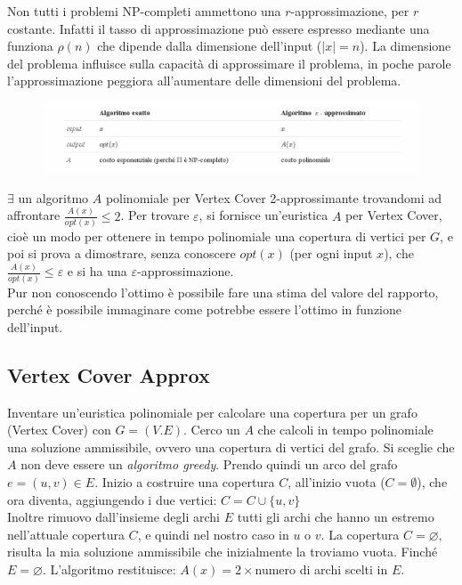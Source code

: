 Non tutti i problemi NP-completi ammettono una $r$-approssimazione, per $r$ costante. Infatti il tasso di approssimazione può essere espresso mediante una funziona $\rho(n)$ che dipende dalla dimensione dell'input ($|x| = n$). La dimensione del problema influisce sulla capacità di approssimare il problema, in poche parole l'approssimazione peggiora all'aumentare delle dimensioni del problema.

\begin{figure}[H]
    \centering
    \includegraphics[scale = 0.5]{imm/algoritmo_esatto.PNG}
\end{figure}

$\exists$ un algoritmo $A$ polinomiale per Vertex Cover 2-approssimante trovandomi ad affrontare $\displaystyle \frac{A(x)}{opt(x)}\leq 2$.
Per trovare $\varepsilon$, si fornisce un'euristica $A$ per Vertex Cover, cioè un modo per ottenere in tempo polinomiale una copertura di vertici per $G$, e poi si prova a dimostrare, senza conoscere $opt(x)$ (per ogni input $x$), che $\displaystyle \frac{A(x)}{opt(x)} \leq \varepsilon$ e si ha una $\varepsilon$-approssimazione.\\
Pur non conoscendo l'ottimo è possibile fare una stima del valore del rapporto, perché è possibile immaginare come potrebbe essere l'ottimo in funzione dell'input.\\

\subsection{Vertex Cover Approx}
Inventare un'euristica polinomiale per calcolare una copertura per un grafo (Vertex Cover) con $G = (V. E)$. 
Cerco un $A$ che calcoli in tempo polinomiale una soluzione ammissibile, ovvero una copertura di vertici del grafo. Si sceglie che $A$ non deve essere un \textit{algoritmo greedy}. Prendo quindi un arco del grafo $e=(u,v)\in E$. Inizio a costruire una copertura $C$, all'inizio vuota ($C=\emptyset$), che ora diventa, aggiungendo i due vertici: $C=C\cup\{u,v\}$\\
Inoltre rimuovo dall'insieme degli archi $E$ tutti gli archi che hanno un estremo nell'attuale copertura $C$, e quindi nel nostro caso in $u$ o $v$. La copertura $C = \varnothing$, risulta la mia soluzione ammissibile che inizialmente la troviamo vuota. Finché $E = \varnothing$.
L'algoritmo restituisce: $A(x) = 2 \times $numero di archi scelti in $E$.

